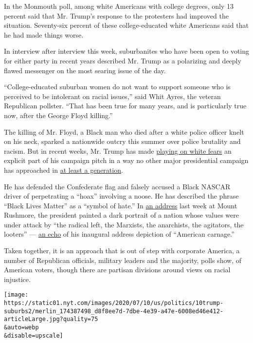 In the Monmouth poll, among white Americans with college degrees, only
13 percent said that Mr. Trump's response to the protesters had improved
the situation. Seventy-six percent of these college-educated white
Americans said that he had made things worse.

In interview after interview this week, suburbanites who have been open
to voting for either party in recent years described Mr. Trump as a
polarizing and deeply flawed messenger on the most searing issue of the
day.

``College-educated suburban women do not want to support someone who is
perceived to be intolerant on racial issues,'' said Whit Ayres, the
veteran Republican pollster. ``That has been true for many years, and is
particularly true now, after the George Floyd killing.''

The killing of Mr. Floyd, a Black man who died after a white police
officer knelt on his neck, sparked a nationwide outcry this summer over
police brutality and racism. But in recent weeks, Mr. Trump has made
\href{https://www.nytimes.com/2020/07/06/us/politics/trump-bubba-wallace-nascar.html}{playing
on white fears} an explicit part of his campaign pitch in a way no other
major presidential campaign has approached in
\href{https://www.nytimes.com/2018/12/03/us/politics/bush-willie-horton.html}{at
least a generation}.

He has defended the Confederate flag and falsely accused a Black NASCAR
driver of perpetrating a ``hoax'' involving a noose. He has described
the phrase ``Black Lives Matter'' as a ``symbol of hate.'' In
\href{https://www.nytimes.com/2020/07/03/us/politics/trump-coronavirus-mount-rushmore.html}{an
address} last week at Mount Rushmore, the president painted a dark
portrait of a nation whose values were under attack by ``the radical
left, the Marxists, the anarchists, the agitators, the looters'' ---
\href{https://www.nytimes.com/2020/07/04/us/politics/trump-mt-rushmore.html}{an
echo} of his inaugural address depiction of ``American carnage.''

Taken together, it is an approach that is out of step with corporate
America, a number of Republican officials, military leaders and the
majority, polls show, of American voters, though there are partisan
divisions around views on racial injustice.

\texttt{[image: https://static01.nyt.com/images/2020/07/10/us/politics/10trump-suburbs2/merlin\_174387498\_d8f8ee7d-7dbe-4e39-a47e-6008ed46e412-articleLarge.jpg?quality=75\\\&auto=webp\\\&disable=upscale]}

